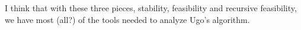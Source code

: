\documentclass[11pt]{article}
\numberwithin{equation}{section}
\begin{document}
I think that with these three pieces, stability, feasibility and recursive feasibility, we have most (all?) of the tools needed to analyze Ugo's algorithm.

%
%
%
\end{document}
